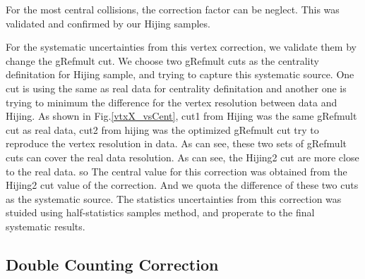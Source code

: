 For the most central collisions, the correction factor can be neglect. This was validated and confirmed by our Hijing samples.


For the systematic uncertainties from this vertex correction, we validate them by change the gRefmult cut. We choose two gRefmult cuts as the centrality definitation for Hijing sample, and trying to capture this systematic source. One cut is using the same as real data for centrality definitation and another one is trying to minimum the difference for the vertex resolution between data and Hijing. As shown in Fig.\ref{vtxX_vsCent}, cut1 from Hijing was the same gRefmult cut as real data, cut2 from hijing was the optimized gRefmult cut try to reproduce the vertex resolution in data. As can see, these two sets of gRefmult cuts can cover the real data resolution. As can see, the Hijing2 cut are more close to the real data. so The central value for this correction was obtained from the Hijing2 cut value of the correction. And we quota the difference of these two cuts as the systematic source. The statistics uncertainties from this correction was stuided using half-statistics samples method, and properate to the final systematic results.

\subsection{Double Counting Correction} 





